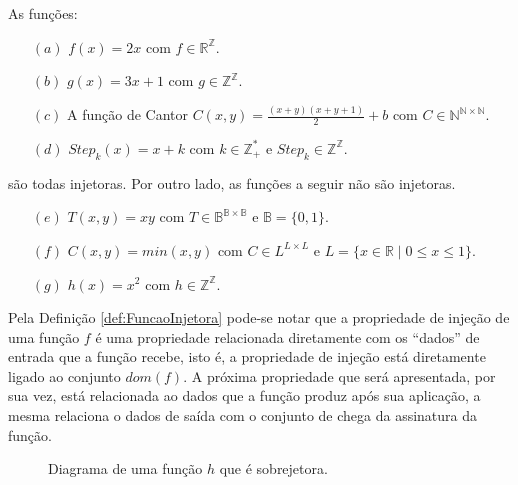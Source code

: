 \begin{exemplo}\label{exe:FuncoesInjetora1}
	As funções:
	\begin{itemize}
		\item[$(a)$] $f(x) = 2x$ com $f \in \mathbb{R}^\mathbb{Z}$.
		\item[$(b)$] $g(x) = 3x + 1$ com $g \in \mathbb{Z}^\mathbb{Z}$.
    \item[$(c)$] A função de Cantor $C(x, y) = \frac{(x + y)(x + y + 1)}{2} + b$ com $C \in \mathbb{N}^{\mathbb{N} \times \mathbb{N}}$.
    \item[$(d)$] $Step_k(x) = x + k$ com $k \in \mathbb{Z}_+^*$ e $Step_k \in \mathbb{Z}^\mathbb{Z}$.
	\end{itemize} 
	são todas injetoras. Por outro lado, as funções a seguir não são injetoras.
	\begin{itemize}
		\item[$(e)$] $T(x, y) = xy$ com $T \in \mathbb{B}^{\mathbb{B} \times \mathbb{B}}$ e $\mathbb{B} = \{0,1\}$.
		\item[$(f)$] $C(x, y) = min(x, y)$ com $C \in L^{L \times L}$ e $L = \{x \in \mathbb{R} \mid 0 \leq x \leq 1\}$.
		\item[$(g)$] $h(x) = x^2$ com $h \in \mathbb{Z}^\mathbb{Z}$.
	\end{itemize} 
\end{exemplo}

Pela Definição \ref{def:FuncaoInjetora} pode-se notar que a propriedade de injeção de uma função $f$ é uma propriedade relacionada diretamente com os ``dados'' de entrada que a função recebe, isto é, a propriedade de injeção está diretamente ligado ao conjunto $dom(f)$. A próxima propriedade que será apresentada, por sua vez, está relacionada ao dados que a função produz após sua aplicação, a mesma relaciona o dados de saída com o conjunto de chega da assinatura da função.


\begin{figure}[h]
	\centering
	\caption{Diagrama de uma função $h$ que é sobrejetora.}
	\label{fig:FuncaoSobrejetora1}	
\end{figure}

